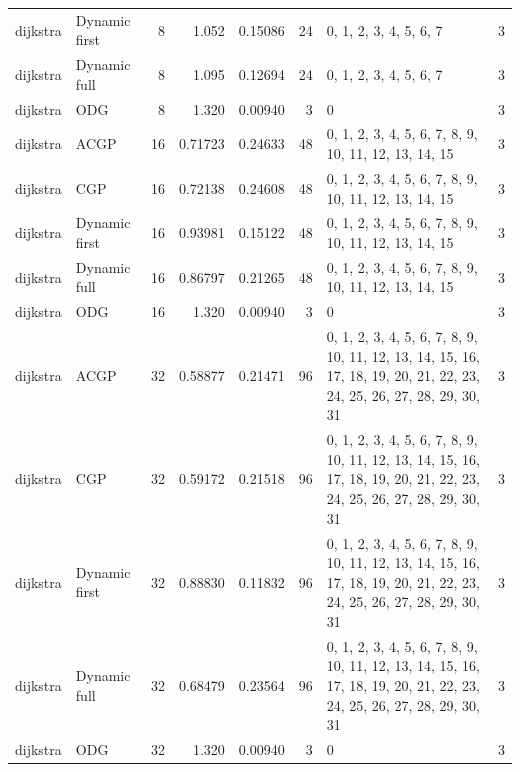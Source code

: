 \documentclass[10pt,a4paper]{article}
\begin{document}
\begin{longtable}{@{}p{23mm}p{29mm}rrrrp{36mm}r@{}}
dijkstra & Dynamic first & 8 & 1.052 & 0.15086 & 24 & 0, 1, 2, 3, 4, 5, 6, 7 & 3 \\
dijkstra & Dynamic full & 8 & 1.095 & 0.12694 & 24 & 0, 1, 2, 3, 4, 5, 6, 7 & 3 \\
dijkstra & ODG & 8 & 1.320 & 0.00940 & 3 & 0 & 3 \\
dijkstra & ACGP & 16 & 0.71723 & 0.24633 & 48 & 0, 1, 2, 3, 4, 5, 6, 7, 8, 9, 10, 11, 12, 13, 14, 15 & 3 \\
dijkstra & CGP & 16 & 0.72138 & 0.24608 & 48 & 0, 1, 2, 3, 4, 5, 6, 7, 8, 9, 10, 11, 12, 13, 14, 15 & 3 \\
dijkstra & Dynamic first & 16 & 0.93981 & 0.15122 & 48 & 0, 1, 2, 3, 4, 5, 6, 7, 8, 9, 10, 11, 12, 13, 14, 15 & 3 \\
dijkstra & Dynamic full & 16 & 0.86797 & 0.21265 & 48 & 0, 1, 2, 3, 4, 5, 6, 7, 8, 9, 10, 11, 12, 13, 14, 15 & 3 \\
dijkstra & ODG & 16 & 1.320 & 0.00940 & 3 & 0 & 3 \\
dijkstra & ACGP & 32 & 0.58877 & 0.21471 & 96 & 0, 1, 2, 3, 4, 5, 6, 7, 8, 9, 10, 11, 12, 13, 14, 15, 16, 17, 18, 19, 20, 21, 22, 23, 24, 25, 26, 27, 28, 29, 30, 31 & 3 \\
dijkstra & CGP & 32 & 0.59172 & 0.21518 & 96 & 0, 1, 2, 3, 4, 5, 6, 7, 8, 9, 10, 11, 12, 13, 14, 15, 16, 17, 18, 19, 20, 21, 22, 23, 24, 25, 26, 27, 28, 29, 30, 31 & 3 \\
dijkstra & Dynamic first & 32 & 0.88830 & 0.11832 & 96 & 0, 1, 2, 3, 4, 5, 6, 7, 8, 9, 10, 11, 12, 13, 14, 15, 16, 17, 18, 19, 20, 21, 22, 23, 24, 25, 26, 27, 28, 29, 30, 31 & 3 \\
dijkstra & Dynamic full & 32 & 0.68479 & 0.23564 & 96 & 0, 1, 2, 3, 4, 5, 6, 7, 8, 9, 10, 11, 12, 13, 14, 15, 16, 17, 18, 19, 20, 21, 22, 23, 24, 25, 26, 27, 28, 29, 30, 31 & 3 \\
dijkstra & ODG & 32 & 1.320 & 0.00940 & 3 & 0 & 3 \\
\end{longtable}\normalsize\setlength{\tabcolsep}{6pt}
\clearpage
\end{document}

